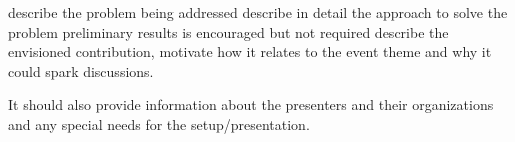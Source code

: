 describe the problem being addressed
describe in detail the approach to solve the problem
preliminary results is encouraged but not required
describe the envisioned contribution,
motivate how it relates to the event theme and
why it could spark discussions.

It should also provide information about the presenters and their organizations 
and any special needs for the setup/presentation.
